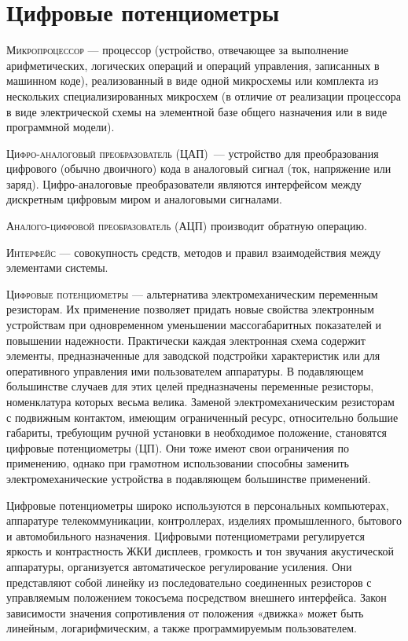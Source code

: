 \section{Цифровые потенциометры}

\textsc{Микропроцессор} --- процессор (устройство, отвечающее за выполнение арифметических, логических операций и операций управления, записанных в машинном коде), реализованный в виде одной микросхемы или комплекта из нескольких специализированных микросхем (в отличие от реализации процессора в виде электрической схемы на элементной базе общего назначения или в виде программной модели).

\textsc{Цифро-аналоговый преобразователь (ЦАП)}~--- устройство для преобразования цифрового (обычно двоичного) кода в аналоговый сигнал (ток, напряжение или заряд). Цифро-аналоговые преобразователи являются интерфейсом между дискретным цифровым миром и аналоговыми сигналами.

\textsc{Аналого-цифровой преобразователь (АЦП)} производит обратную операцию.

\textsc{Интерфейс} --- совокупность средств, методов и правил взаимодействия между элементами системы.

\textsc{Цифровые потенциометры} --- альтернатива электромеханическим переменным резисторам. Их применение позволяет придать новые свойства электронным устройствам при одновременном уменьшении массогабаритных показателей и повышении надежности. Практически каждая электронная схема содержит элементы, предназначенные для заводской подстройки характеристик или для оперативного управления ими пользователем аппаратуры. В подавляющем большинстве случаев для этих целей предназначены переменные резисторы, номенклатура которых весьма велика. Заменой электромеханическим резисторам с подвижным контактом, имеющим ограниченный ресурс, относительно большие габариты, требующим ручной установки в необходимое положение, становятся цифровые потенциометры (ЦП). Они тоже имеют свои ограничения по применению, однако при грамотном использовании способны заменить электромеханические устройства в подавляющем большинстве применений.

Цифровые потенциометры широко используются в персональных компьютерах, аппаратуре телекоммуникации, контроллерах, изделиях промышленного, бытового и автомобильного назначения. Цифровыми потенциометрами регулируется яркость и контрастность ЖКИ дисплеев, громкость и тон звучания акустической аппаратуры, организуется автоматическое регулирование усиления. Они представляют собой линейку из последовательно соединенных резисторов с управляемым положением токосъема посредством внешнего интерфейса. Закон зависимости значения сопротивления от положения «движка» может быть линейным, логарифмическим, а также программируемым пользователем.

